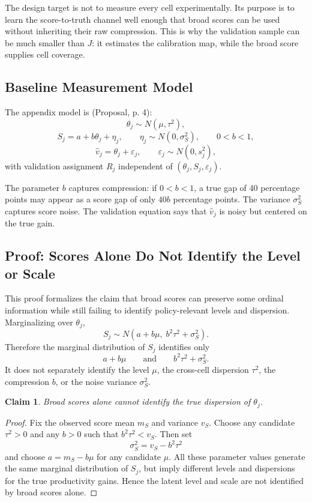 \documentclass[11pt]{article}
\newtheorem{claim}{Claim}
\begin{document}
The design target is not to measure every cell experimentally. Its purpose is to learn the score-to-truth channel well enough that broad scores can be used without inheriting their raw compression. This is why the validation sample can be much smaller than $J$: it estimates the calibration map, while the broad score supplies cell coverage.

\subsection{Baseline Measurement Model}

The appendix model is (Proposal, p. 4):
\[
  \theta_j\sim N(\mu,\tau^2),
\]
\[
  S_j=a+b\theta_j+\eta_j,\qquad \eta_j\sim N(0,\sigma_S^2),\qquad 0<b<1,
\]
\[
  \widehat v_j=\theta_j+\varepsilon_j,\qquad \varepsilon_j\sim N(0,s_j^2),
\]
with validation assignment $R_j$ independent of $(\theta_j,S_j,\varepsilon_j)$.

The parameter $b$ captures compression: if $0<b<1$, a true gap of 40 percentage points may appear as a score gap of only $40b$ percentage points. The variance $\sigma_S^2$ captures score noise. The validation equation says that $\widehat v_j$ is noisy but centered on the true gain.

\subsection{Proof: Scores Alone Do Not Identify the Level or Scale}

This proof formalizes the claim that broad scores can preserve some ordinal information while still failing to identify policy-relevant levels and dispersion. Marginalizing over $\theta_j$,
\[
  S_j\sim N(a+b\mu,\; b^2\tau^2+\sigma_S^2).
\]
Therefore the marginal distribution of $S_j$ identifies only
\[
  a+b\mu
  \qquad\text{and}\qquad
  b^2\tau^2+\sigma_S^2.
\]
It does not separately identify the level $\mu$, the cross-cell dispersion $\tau^2$, the compression $b$, or the noise variance $\sigma_S^2$.

\begin{claim}
Broad scores alone cannot identify the true dispersion of $\theta_j$.
\end{claim}

\begin{proof}
Fix the observed score mean $m_S$ and variance $v_S$. Choose any candidate $\tau^2>0$ and any $b>0$ such that $b^2\tau^2<v_S$. Then set
\[
  \sigma_S^2=v_S-b^2\tau^2
\]
and choose $a=m_S-b\mu$ for any candidate $\mu$. All these parameter values generate the same marginal distribution of $S_j$, but imply different levels and dispersions for the true productivity gains. Hence the latent level and scale are not identified by broad scores alone.
\end{proof}
\end{document}
